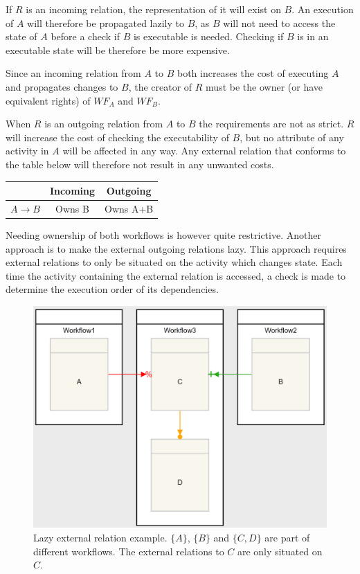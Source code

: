 \documentclass{article}
\begin{document}
			If $R$ is an incoming relation, the representation of it will exist on $B$. 
			An execution of $A$ will therefore be propagated lazily to $B$, as $B$ will not need to access the state of $A$ before a check if $B$ is executable is needed. 
			Checking if $B$ is in an executable state will be therefore be more expensive.

			Since an incoming relation from $A$ to $B$ both increases the cost of executing $A$ and propagates changes to $B$, the creator of $R$ must be the owner (or have equivalent rights) of $WF_{A}$ and $WF_{B}$.

			When $R$ is an outgoing relation from $A$ to $B$ the requirements are not as strict. $R$ will increase the cost of checking the executability of $B$, but no attribute of any activity in $A$ will be affected in any way. 
			Any external relation that conforms to the table below will therefore not result in any unwanted costs.

			\begin{table}[!ht]
				\begin{tabular}{|c|c|c|}
				\hline
				 					& Incoming 	& Outgoing \\ \hline
				$A \rightarrow B$ 	& Owns B    & Owns A+B \\
				\hline
				\end{tabular}
			\end{table}
			
			Needing ownership of both workflows is however quite restrictive.
			Another approach is to make the external outgoing relations lazy.
			This approach requires external relations to only be situated on the activity which changes state.
			Each time the activity containing the external relation is accessed, a check is made to determine the execution order of its dependencies.

			\begin{figure}[!ht]
				\centering
				\includegraphics[scale=0.4]{figures/lazy-external-relation-example.PNG}
			 	\caption[Lazy external relation example]
			 	{Lazy external relation example. $\{A\}$, $\{B\}$ and $\{C, D\}$ are part of different workflows. The external relations to $C$ are only situated on $C$.}
			 	\label{fig:lazy-external-relations-example}
			\end{figure}
\end{document}
